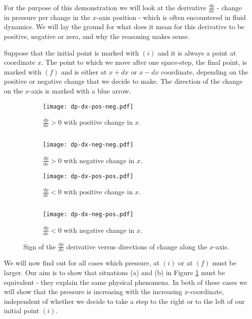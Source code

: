 For the purpose of this demonstration we will look at the derivative $\frac{dp}{dx}$ - change in pressure per change in the $x$-axis position - which is often encountered in fluid dynamics. We will lay the ground for what does it mean for this derivative to be positive, negative or zero, and why the reasoning makes sense.

Suppose that the initial point is marked with \textcolor{myblue}{$(i)$} and it is always a point at coordinate $x$. The point to which we move after one space-step, the final point, is marked with \textcolor{myblue}{$(f)$} and is either at $x+dx$ or $x - dx$ coordinate, depending on the positive or negative change that we decide to make. The direction of the change on the $x$-axis is marked with a blue arrow.

\begin{figure}[H]
\begin{subfigure}[t]{.46\textwidth}
\centering
\texttt{[image: dp-dx-pos-neg.pdf]}
\caption{$\frac{dp}{dx} > 0$ with positive change in $x$.}
\end{subfigure}
\begin{minipage}[t]{.07\textwidth}
$ $
\vspace*{1.5cm}
\end{minipage}
\begin{subfigure}[t]{.46\textwidth}
\centering
\texttt{[image: dp-dx-neg-neg.pdf]}
\caption{$\frac{dp}{dx} > 0$ with negative change in $x$.}
\end{subfigure}
\begin{subfigure}[t]{.46\textwidth}
\centering
\texttt{[image: dp-dx-pos-pos.pdf]}
\caption{$\frac{dp}{dx} < 0$ with positive change in $x$.}
\end{subfigure}
\begin{minipage}[t]{.08\textwidth}
$ $
\end{minipage}
\begin{subfigure}[t]{.46\textwidth}
\centering
\texttt{[image: dp-dx-neg-pos.pdf]}
\caption{$\frac{dp}{dx} < 0$ with negative change in $x$.}
\end{subfigure}
\caption{Sign of the $\frac{dp}{dx}$ derivative versus directions of change along the $x$-axis.}
\label{fig:dp-dx-signs}
\end{figure}

We will now find out for all cases which pressure, at \textcolor{myblue}{$(i)$} or at \textcolor{myblue}{$(f)$} must be larger. Our aim is to show that situations (a) and (b) in Figure \ref{fig:dp-dx-signs} must be equivalent - they explain the same physical phenomena. In both of these cases we will show that the pressure is increasing with the increasing $x$-coordinate, independent of whether we decide to take a step to the right or to the left of our initial point \textcolor{myblue}{$(i)$}. 

